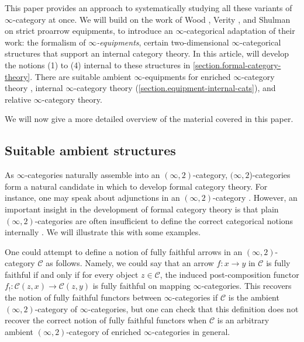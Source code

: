 \documentclass[a4paper, 11pt]{amsart}
\numberwithin{theorem}{section}
\theoremstyle{definition}
\newcommand{\C}{\mathscr{C}}
\begin{document}
This paper provides an approach to systematically studying all these variants of $\infty$-category at once. 
We will build on the work of Wood \cite{Wood}, Verity \cite{Verity}, and Shulman \cite{ShulmanFramedBicats} on strict proarrow equipments, 
to introduce an $\infty$-categorical adaptation of their work: the formalism of \textit{$\infty$-equipments}, certain two-dimensional $\infty$-categorical structures
that support an internal category theory. In this article,  will develop the notions (1) to (4)  internal 
to these structures in \cref{section.formal-category-theory}. There are suitable ambient $\infty$-equipments for enriched $\infty$-category theory \cite{HaugsengEnriched}, internal $\infty$-category theory (\cref{section.equipment-internal-cats}), 
and relative $\infty$-category theory. 

We will now give a more detailed overview of the material covered in this paper.

\subsection{Suitable ambient structures} As $\infty$-categories naturally assemble into an $(\infty,2)$-category, 
$(\infty,2$)-categories form a natural candidate in which to develop formal category theory. For instance, 
one may speak about adjunctions in an $(\infty,2)$-category \cite{RiehlVerityAdj}. 
However, an important insight in the development of formal category theory is that plain $(\infty,2)$-categories are often insufficient to define the correct categorical notions internally \cite[Section 0]{Wood}.
We will illustrate this with some examples.

One could attempt to define a notion of fully faithful arrows in an $(\infty,2)$-category $\C$ as follows. Namely, we could say that an arrow $f : x \rightarrow y$ in $\C$  
is fully faithful if and only if for every object $z \in \C$, the induced post-composition functor 
$
f_!: \C(z,x) \rightarrow \C(z,y)
$
is fully faithful on mapping $\infty$-categories. This recovers the notion of fully faithful functors between $\infty$-categories if $\C$ is the ambient $(\infty,2)$-category of $\infty$-categories, 
but one can check that this definition does not recover the correct notion of 
fully faithful functors when $\C$ is an arbitrary ambient $(\infty,2)$-category of enriched $\infty$-categories in general.
\end{document}
